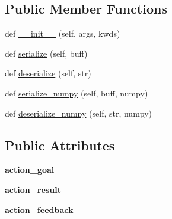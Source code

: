 \subsection*{Public Member Functions}
\begin{DoxyCompactItemize}
\item 
def \hyperlink{classexp__assignment2_1_1msg_1_1__PlanningAction_1_1PlanningAction_a97a18344111d391b89ba90aeb2ce1c8f}{\+\_\+\+\_\+init\+\_\+\+\_\+} (self, args, kwds)
\item 
def \hyperlink{classexp__assignment2_1_1msg_1_1__PlanningAction_1_1PlanningAction_adefe8b8d64f50f881432f745c330a88f}{serialize} (self, buff)
\item 
def \hyperlink{classexp__assignment2_1_1msg_1_1__PlanningAction_1_1PlanningAction_a67a9e7b0dda940f312ffcb35f7cfb419}{deserialize} (self, str)
\item 
def \hyperlink{classexp__assignment2_1_1msg_1_1__PlanningAction_1_1PlanningAction_a2660ed95afa8c6c9665969085b4cbd85}{serialize\+\_\+numpy} (self, buff, numpy)
\item 
def \hyperlink{classexp__assignment2_1_1msg_1_1__PlanningAction_1_1PlanningAction_ab9e79157787c279e2a8b8427db148ed1}{deserialize\+\_\+numpy} (self, str, numpy)
\end{DoxyCompactItemize}
\subsection*{Public Attributes}
\begin{DoxyCompactItemize}
\item 
\mbox{\label{classexp__assignment2_1_1msg_1_1__PlanningAction_1_1PlanningAction_aee6dc919be5bd91086b530c8c5a53da5}} 
{\bfseries action\+\_\+goal}
\item 
\mbox{\label{classexp__assignment2_1_1msg_1_1__PlanningAction_1_1PlanningAction_a05dda7c7227197614c3341cc57db0286}} 
{\bfseries action\+\_\+result}
\item 
\mbox{\label{classexp__assignment2_1_1msg_1_1__PlanningAction_1_1PlanningAction_a9cc72e74f00d7c6bf66855ebd2219a2d}} 
{\bfseries action\+\_\+feedback}
\end{DoxyCompactItemize}


